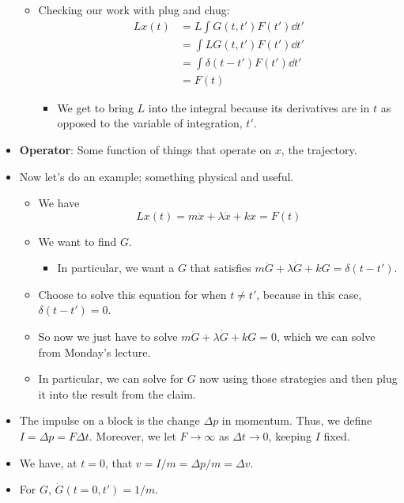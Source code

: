 \documentclass[../notes.tex]{subfiles}
\begin{document}
\begin{itemize}
\begin{itemize}
        \item Checking our work with plug and chug:
        \begin{align*}
            Lx(t) &= L\int G(t,t')F(t')\dd{t'}\\
            &= \int LG(t,t')F(t')\dd{t'}\\
            &= \int\delta(t-t')F(t')\dd{t'}\\
            &= F(t)
        \end{align*}
        \begin{itemize}
            \item We get to bring $L$ into the integral because its derivatives are in $t$ as opposed to the variable of integration, $t'$.
        \end{itemize}
    \end{itemize}
    \item \textbf{Operator}: Some function of things that operate on $x$, the trajectory.
    \item Now let's do an example; something physical and useful.
    \begin{itemize}
        \item We have
        \begin{equation*}
            Lx(t) = m\ddot{x}+\lambda\dot{x}+kx = F(t)
        \end{equation*}
        \item We want to find $G$.
        \begin{itemize}
            \item In particular, we want a $G$ that satisfies $m\ddot{G}+\lambda\dot{G}+kG=\delta(t-t')$.
        \end{itemize}
        \item Choose to solve this equation for when $t\neq t'$, because in this case, $\delta(t-t')=0$.
        \item So now we just have to solve $m\ddot{G}+\lambda\dot{G}+kG=0$, which we can solve from Monday's lecture.
        \item In particular, we can solve for $G$ now using those strategies and then plug it into the result from the claim.
    \end{itemize}
    \item The impulse on a block is the change $\Delta p$ in momentum. Thus, we define $I=\Delta p=F\Delta t$. Moreover, we let $F\to\infty$ as $\Delta t\to 0$, keeping $I$ fixed.
    \item We have, at $t=0$, that $v=I/m=\Delta p/m=\Delta v$.
    \item For $G$, $\dot{G}(t=0,t')=1/m$.

\end{itemize}
\end{document}
